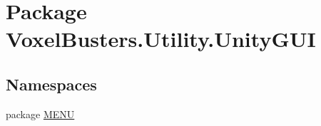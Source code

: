 \hypertarget{namespace_voxel_busters_1_1_utility_1_1_unity_g_u_i}{}\section{Package Voxel\+Busters.\+Utility.\+Unity\+G\+U\+I}
\label{namespace_voxel_busters_1_1_utility_1_1_unity_g_u_i}
\subsection*{Namespaces}
\begin{DoxyCompactItemize}
\item 
package \hyperlink{namespace_voxel_busters_1_1_utility_1_1_unity_g_u_i_1_1_m_e_n_u}{M\+E\+N\+U}
\end{DoxyCompactItemize}
